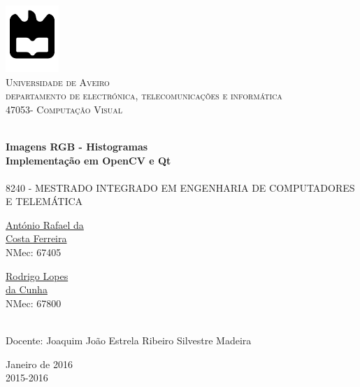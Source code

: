 \begin{titlepage}

\begin{center}

\includegraphics[width=0.15\textwidth]{./logo}\\[0.5cm]    

\textsc{\large Universidade de Aveiro \\[1cm]\large departamento de electrónica, telecomunicações e informática}\\[1cm]

\textsc{\large{47053}\large - Computação Visual \\[1cm]}

\HRule \\[0.5cm]
{ \huge \bfseries Imagens RGB - Histogramas}\\[0.4cm]
{ \large \bfseries Implementação em OpenCV e Qt}\\[0.4cm]
\HRule \\[1cm]

\textsc{\small{8240 - MESTRADO INTEGRADO EM ENGENHARIA DE COMPUTADORES E TELEMÁTICA}}\\[1cm]

\begin{minipage}{0.4\textwidth}

\begin{flushleft} \large
\href{mailto:rafael.ferreira@ua.pt}{António Rafael da \\ Costa Ferreira }
 \small{\\NMec: 67405}
\end{flushleft}
\end{minipage}
\begin{minipage}{0.4\textwidth}

\begin{flushright} \large
\href{mailto:rodrigocunha@ua.pt}{Rodrigo Lopes \\ da Cunha}
\small{\\NMec: 67800}
\end{flushright}
\end{minipage}\\[1cm]

{\large Docente: Joaquim João Estrela Ribeiro Silvestre Madeira  }\\[0.5cm]

\vfill

{\large Janeiro de 2016 \\ 2015-2016}

\end{center}

\end{titlepage}